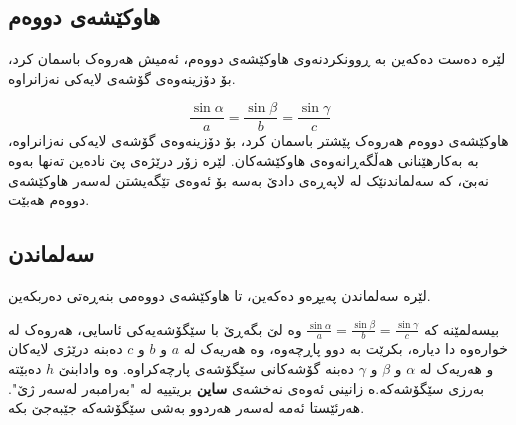 \documentclass[a4paper,12pt]{article}
\begin{document}
\subsection{هاوکێشەی دووەم}
\begin{center}
لێرە دەست دەکەین بە ڕوونکردنەوی هاوکێشەی دووەم، ئەمیش هەروەک باسمان کرد، بۆ دۆزینەوەی گۆشەی لایەکی نەزانراوە.
\end{center}
\begin{center}
\end{center}
$$\frac{\sin \alpha}{a}=\frac{\sin \beta}{b}=\frac{\sin \gamma}{c}$$
هاوکێشەی دووەم هەروەک پێشتر باسمان کرد، بۆ دۆزینەوەی گۆشەی لایەکی نەزانراوە، بە بەکارهێنانی هەڵگەڕانەوەی هاوکێشەکان. لێرە زۆر درێژەی پێ نادەین تەنها بەوە نەبێ، کە سەلماندنێک لە لاپەڕەی دادێ بەسە بۆ ئەوەی تێگەیشتن لەسەر هاوکێشەی دووەم هەبێت. 
\newpage
\subsection{سەلماندن}
\begin{center}
لێرە سەلماندن پەیڕەو دەکەین،  تا هاوکێشەی دووەمی بنەڕەتی دەربکەین.
\end{center}
بیسەلمێنە کە $\frac{\sin \alpha}{a}=\frac{\sin \beta}{b}=\frac{\sin \gamma}{c}$ وە لێ بگەڕێ با سێگۆشەیەکی ئاسایی، هەروەک لە خوارەوە دا دیارە، بکرێت بە دوو پاڕچەوە، وە هەریەک لە $a$ و $b$ و $c$ دەبنە درێژی لایەکان و هەریەک لە $\alpha$ و $\beta$ و $\gamma$ دەبنە گۆشەکانی سێگۆشەی پارچەکراوە. وە وادابنێ $h$ دەبێتە بەرزی سێگۆشەکە.ە زانینی ئەوەی نەخشەی \textbf{ساین} بریتییە لە "بەرامبەر لەسەر ژێ". هەرئێستا ئەمە لەسەر هەردوو بەشی سێگۆشەکە جێبەجێ بکە.\\
\end{document}
